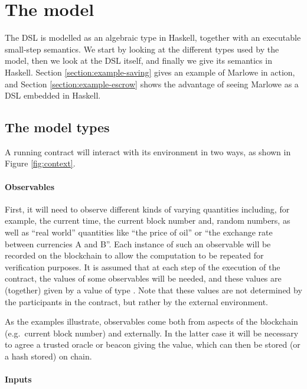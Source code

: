 \documentclass[
      acmsmall
    , screen
  ]{acmart}
\begin{document}
\section{The model}
\label{section:model}

The DSL is modelled as an algebraic type in Haskell, together with an executable small-step semantics. 
We start by looking at the different types used by the model, then we look at the  DSL itself, and finally we give its semantics in Haskell. Section \ref{section:example-saving} gives an example of Marlowe in action, and Section
\ref{section:example-escrow} shows the advantage of seeing Marlowe as a DSL embedded in Haskell.

\subsection{The model types}

A running contract will interact with its environment in two ways, as shown in Figure \ref{fig:context}.

\paragraph{Observables}


First, it will need to observe different kinds of varying quantities including, for example, the current time, the current block number and, random numbers, as well as ``real world'' quantities like ``the price of oil'' or ``the exchange rate between currencies A and B''. Each instance of such an observable will be recorded on the blockchain to allow the computation to be repeated for verification purposes. It is assumed that at each step of the execution of the contract, the values of some observables will be needed, and these values are (together) given by a value of type . Note that these values are not determined by the participants in the contract, but rather by the external environment.

As the examples illustrate, observables come both from aspects of the blockchain (e.g.\ current block number) and externally. In the latter case it will be necessary to agree a trusted oracle or beacon giving the value, which can then be stored (or a hash stored) on chain.

\paragraph{Inputs}
\end{document}
